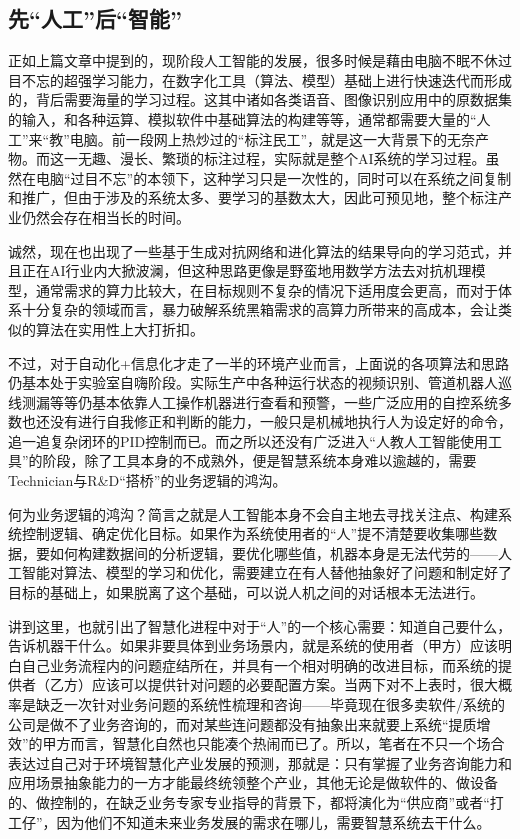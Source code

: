 \documentclass[
]{book}
\begin{document}
\hypertarget{ux5148ux4ebaux5de5ux540eux667aux80fd}{%
\subsection{先``人工''后``智能''}\label{ux5148ux4ebaux5de5ux540eux667aux80fd}}

正如上篇文章中提到的，现阶段人工智能的发展，很多时候是藉由电脑不眠不休过目不忘的超强学习能力，在数字化工具（算法、模型）基础上进行快速迭代而形成的，背后需要海量的学习过程。这其中诸如各类语音、图像识别应用中的原数据集的输入，和各种运算、模拟软件中基础算法的构建等等，通常都需要大量的``人工''来``教''电脑。前一段网上热炒过的``标注民工''，就是这一大背景下的无奈产物。而这一无趣、漫长、繁琐的标注过程，实际就是整个AI系统的学习过程。虽然在电脑``过目不忘''的本领下，这种学习只是一次性的，同时可以在系统之间复制和推广，但由于涉及的系统太多、要学习的基数太大，因此可预见地，整个标注产业仍然会存在相当长的时间。

诚然，现在也出现了一些基于生成对抗网络和进化算法的结果导向的学习范式，并且正在AI行业内大掀波澜，但这种思路更像是野蛮地用数学方法去对抗机理模型，通常需求的算力比较大，在目标规则不复杂的情况下适用度会更高，而对于体系十分复杂的领域而言，暴力破解系统黑箱需求的高算力所带来的高成本，会让类似的算法在实用性上大打折扣。

不过，对于自动化+信息化才走了一半的环境产业而言，上面说的各项算法和思路仍基本处于实验室自嗨阶段。实际生产中各种运行状态的视频识别、管道机器人巡线测漏等等仍基本依靠人工操作机器进行查看和预警，一些广泛应用的自控系统多数也还没有进行自我修正和判断的能力，一般只是机械地执行人为设定好的命令，追一追复杂闭环的PID控制而已。而之所以还没有广泛进入``人教人工智能使用工具''的阶段，除了工具本身的不成熟外，便是智慧系统本身难以逾越的，需要Technician与R\&D``搭桥''的业务逻辑的鸿沟。

何为业务逻辑的鸿沟？简言之就是人工智能本身不会自主地去寻找关注点、构建系统控制逻辑、确定优化目标。如果作为系统使用者的``人''提不清楚要收集哪些数据，要如何构建数据间的分析逻辑，要优化哪些值，机器本身是无法代劳的------人工智能对算法、模型的学习和优化，需要建立在有人替他抽象好了问题和制定好了目标的基础上，如果脱离了这个基础，可以说人机之间的对话根本无法进行。

讲到这里，也就引出了智慧化进程中对于``人''的一个核心需要：知道自己要什么，告诉机器干什么。如果非要具体到业务场景内，就是系统的使用者（甲方）应该明白自己业务流程内的问题症结所在，并具有一个相对明确的改进目标，而系统的提供者（乙方）应该可以提供针对问题的必要配置方案。当两下对不上表时，很大概率是缺乏一次针对业务问题的系统性梳理和咨询------毕竟现在很多卖软件/系统的公司是做不了业务咨询的，而对某些连问题都没有抽象出来就要上系统``提质增效''的甲方而言，智慧化自然也只能凑个热闹而已了。所以，笔者在不只一个场合表达过自己对于环境智慧化产业发展的预测，那就是：只有掌握了业务咨询能力和应用场景抽象能力的一方才能最终统领整个产业，其他无论是做软件的、做设备的、做控制的，在缺乏业务专家专业指导的背景下，都将演化为``供应商''或者``打工仔''，因为他们不知道未来业务发展的需求在哪儿，需要智慧系统去干什么。
\end{document}
